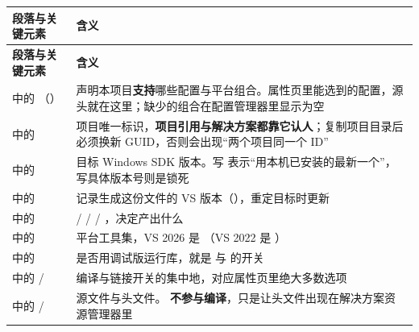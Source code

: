 \begin{longtable}{L{7.2cm}L{7.4cm}}
\toprule
\textbf{段落与关键元素} & \textbf{含义} \\
\midrule
\endfirsthead
\toprule
\textbf{段落与关键元素} & \textbf{含义} \\
\midrule
\endhead
\bottomrule
\endlastfoot
{} 中的 （） & 声明本项目\textbf{支持}哪些配置与平台组合。属性页里能选到的配置，源头就在这里；缺少的组合在配置管理器里显示为空 \\
 中的  & 项目唯一标识，\textbf{项目引用与解决方案都靠它认人}；复制项目目录后必须换新 GUID，否则会出现“两个项目同一个 ID” \\
 中的  & 目标 Windows SDK 版本。写  表示“用本机已安装的最新一个”，写具体版本号则是锁死 \\
 中的  & 记录生成这份文件的 VS 版本（），重定目标时更新 \\
 中的  &  /  /  / ，决定产出什么 \\
 中的  & 平台工具集，VS 2026 是 （VS 2022 是 ） \\
 中的  & 是否用调试版运行库，就是  与  的开关 \\
 中的  /  & 编译与链接开关的集中地，对应属性页里绝大多数选项 \\
 中的  /  & 源文件与头文件。\textbf{ 不参与编译}，只是让头文件出现在解决方案资源管理器里 \\
\end{longtable}

